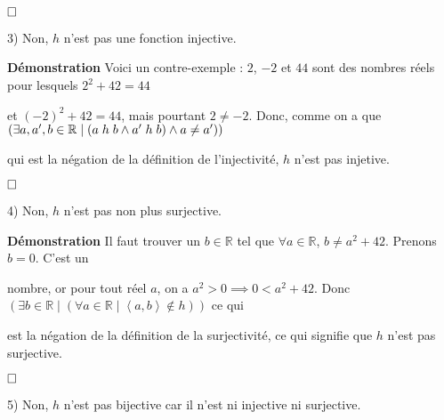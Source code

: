 \documentclass{article}
\newcommand{\tuple}[1]{\ensuremath{\left\langle #1 \right\rangle}}
\begin{document}
$\hfill \square$

3) Non, $h$ n'est pas une fonction injective.

\textbf{Démonstration} Voici un contre-exemple : $2$, $-2$ et $44$ sont des nombres réels pour lesquels $2^2 + 42 = 44$ 

et $(-2)^2 + 42 = 44$, mais pourtant $2 \neq -2$. Donc, comme on a que $ ( \exists a, a^{\prime}, b \in \mathbb{R} \mid ( a \hspace{.1cm} h \hspace{.1cm} b \land a^{\prime} \hspace{.1cm} h \hspace{.1cm} b) \land a \neq a^{\prime} )) $ 

qui est la négation de la définition de l'injectivité, $h$ n'est pas injetive.

$\hfill \square$

4) Non, $h$ n'est pas non plus surjective.

\textbf{Démonstration} Il faut trouver un $b \in \mathbb{R}$ tel que $\forall a \in \mathbb{R}$, $b \neq a^2 + 42$. Prenons $b=0$. C'est un 

nombre, or pour tout réel $a$, on a $a^2 > 0 \implies 0 < a^2 + 42$. Donc $( \exists b \in \mathbb{R} \mid ( \forall a \in \mathbb{R} \mid \tuple{a,b} \notin h ))$ ce qui 

est la négation de la définition de la surjectivité, ce qui signifie que $h$ n'est pas surjective.

$\hfill \square$

5) Non, $h$ n'est pas bijective car il n'est ni injective ni surjective.

\vspace{0.5cm}
\end{document}
